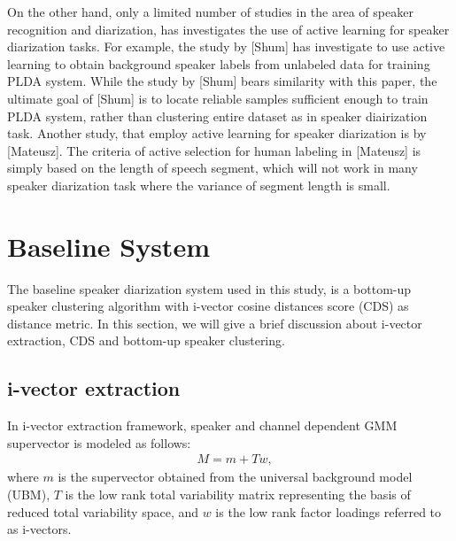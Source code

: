 \documentclass[journal]{IEEEtran}
\begin{document}
On the other hand, only a limited number of studies in the area of speaker recognition and diarization, has investigates the use of active learning for speaker diarization tasks. For example, the study by [Shum] has investigate to use active learning to obtain background speaker labels from unlabeled data for training PLDA system. While the study by [Shum] bears similarity with this paper, the ultimate goal of [Shum] is to locate reliable samples sufficient enough to train PLDA system, rather than clustering entire dataset as in speaker diairization task. Another study, that employ active learning for speaker diarization is by [Mateusz]. The criteria of active selection for human labeling in [Mateusz] is simply based on the length of speech segment, which will not work in many speaker diarization task where the variance of segment length is small.

\section{Baseline System}
\label{bs}
The baseline speaker diarization system used in this study, is a bottom-up speaker clustering algorithm with i-vector cosine distances score (CDS) as distance metric. In this section, we will give a brief discussion about i-vector extraction, CDS and bottom-up speaker clustering. 

\subsection{i-vector extraction}
In i-vector extraction framework, speaker and channel dependent GMM supervector is modeled as follows:
\begin{equation}
\begin{aligned}
& M=m+Tw,
\label{mmtw}
\end{aligned}
\end{equation}
where $m$ is the supervector obtained from the universal background model (UBM), 
$T$ is the low rank total variability matrix representing the basis of reduced total variability space, 
and $w$ is the low rank factor loadings referred to as i-vectors. 
\end{document}
